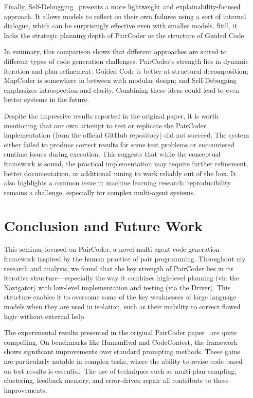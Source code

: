 \documentclass[11pt,a4paper]{article}
\begin{document}
Finally, Self-Debugging~\cite{chen2024selfdebugging} presents a more lightweight and explainability-focused approach. It allows models to reflect on their own failures using a sort of internal dialogue, which can be surprisingly effective even with smaller models. Still, it lacks the strategic planning depth of PairCoder or the structure of Guided Code.

In summary, this comparison shows that different approaches are suited to different types of code generation challenges. PairCoder’s strength lies in dynamic iteration and plan refinement; Guided Code is better at structural decomposition; MapCoder is somewhere in between with modular design; and Self-Debugging emphasizes introspection and clarity. Combining these ideas could lead to even better systems in the future.

Despite the impressive results reported in the original paper, it is worth mentioning that our own attempt to test or replicate the PairCoder implementation (from the official GitHub repository) did not succeed. The system either failed to produce correct results for some test problems or encountered runtime issues during execution. This suggests that while the conceptual framework is sound, the practical implementation may require further refinement, better documentation, or additional tuning to work reliably out of the box. It also highlights a common issue in machine learning research: reproducibility remains a challenge, especially for complex multi-agent systems.


\section{Conclusion and Future Work}

This seminar focused on PairCoder, a novel multi-agent code generation framework inspired by the human practice of pair programming. Throughout my research and analysis, we found that the key strength of PairCoder lies in its iterative structure—especially the way it combines high-level planning (via the Navigator) with low-level implementation and testing (via the Driver). This structure enables it to overcome some of the key weaknesses of large language models when they are used in isolation, such as their inability to correct flawed logic without external help.

The experimental results presented in the original PairCoder paper~\cite{zhang2024paircoder} are quite compelling. On benchmarks like HumanEval and CodeContest, the framework shows significant improvements over standard prompting methods. These gains are particularly notable in complex tasks, where the ability to revise code based on test results is essential. The use of techniques such as multi-plan sampling, clustering, feedback memory, and error-driven repair all contribute to these improvements.
\end{document}
